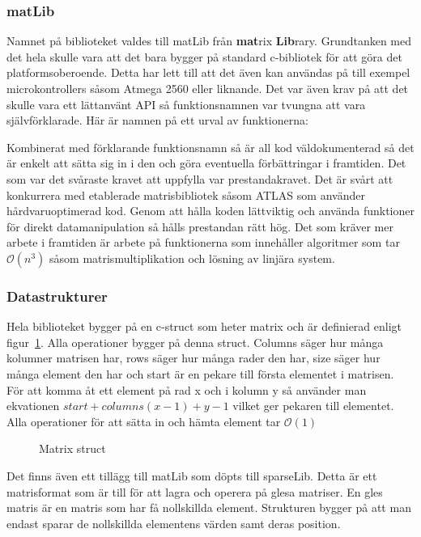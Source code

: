 \subsubsection{matLib}
Namnet på biblioteket valdes till matLib från \textbf{mat}rix \textbf{Lib}rary. Grundtanken med det hela skulle vara att det bara bygger på standard c-bibliotek för att göra det platformsoberoende. Detta har lett till att det även kan användas på till exempel microkontrollers såsom Atmega 2560 eller liknande.
Det var även krav på att det skulle vara ett lättanvänt API så funktionsnamnen var tvungna att vara självförklarade. Här är namnen på ett urval av funktionerna:

Kombinerat med förklarande funktionsnamn så är all kod väldokumenterad så det är enkelt att sätta sig in i den och göra eventuella förbättringar i framtiden.
\newline
\newline
Det som var det svåraste kravet att uppfylla var prestandakravet. Det är svårt att konkurrera med etablerade matrisbibliotek såsom ATLAS som använder hårdvaruoptimerad kod. Genom att hålla koden lättviktig och använda funktioner för direkt datamanipulation så hålls prestandan rätt hög. Det som kräver mer arbete i framtiden är arbete på funktionerna som innehåller algoritmer som tar $\mathcal{O}(n^3)$ såsom matrismultiplikation och lösning av linjära system.



\subsubsection{Datastrukturer}
Hela biblioteket bygger på en c-struct som heter matrix och är definierad enligt figur~\ref{fig:matrix_struct}. Alla operationer bygger på denna struct. Columns säger hur många kolumner matrisen har, rows säger hur många rader den har, size säger hur många element den har och start är en pekare till första elementet i matrisen. För att komma åt ett element på rad x och i kolumn y så använder man ekvationen $start+columns(x-1)+y-1$ vilket ger pekaren till elementet. Alla operationer för att sätta in och hämta element tar $\mathcal{O}(1)$
\begin{figure}[H]

\caption{Matrix struct}
\label{fig:matrix_struct}
\end{figure}


Det finns även ett tillägg till matLib som döpts till sparseLib. Detta är ett matrisformat som är till för att lagra och operera på glesa matriser. En gles matris är en matris som har få nollskillda element. Strukturen bygger på att man endast sparar de nollskillda elementens värden samt deras position. 

